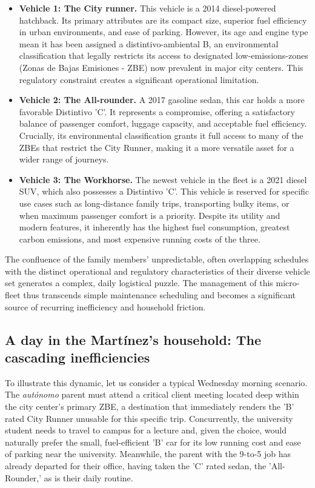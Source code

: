 \begin{itemize}
\item \textbf{Vehicle 1: The City runner.} This vehicle is a 2014 diesel-powered hatchback. Its primary attributes are its compact size, superior fuel efficiency in urban environments, and ease of parking. However, its age and engine type mean it has been assigned a \gls{distintivo-ambiental} B, an environmental classification that legally restricts its access to designated \gls{low-emissions-zones} (Zonas de Bajas Emisiones - ZBE) now prevalent in major city centers. This regulatory constraint creates a significant operational limitation.
\item \textbf{Vehicle 2: The All-rounder.} A 2017 gasoline sedan, this car holds a more favorable Distintivo 'C'. It represents a compromise, offering a satisfactory balance of passenger comfort, luggage capacity, and acceptable fuel efficiency. Crucially, its environmental classification grants it full access to many of the ZBEs that restrict the City Runner, making it a more versatile asset for a wider range of journeys.
\item \textbf{Vehicle 3: The Workhorse.} The newest vehicle in the fleet is a 2021 diesel SUV, which also possesses a Distintivo 'C'. This vehicle is reserved for specific use cases such as long-distance family trips, transporting bulky items, or when maximum passenger comfort is a priority. Despite its utility and modern features, it inherently has the highest fuel consumption, greatest carbon emissions, and most expensive running costs of the three.
\end{itemize}

The confluence of the family members' unpredictable, often overlapping schedules with the distinct operational and regulatory characteristics of their diverse vehicle set generates a complex, daily logistical puzzle. The management of this micro-fleet thus transcends simple maintenance scheduling and becomes a significant source of recurring inefficiency and household friction.

\subsection{A day in the Martínez's household: The cascading inefficiencies}

To illustrate this dynamic, let us consider a typical Wednesday morning scenario. The \textit{autónomo} parent must attend a critical client meeting located deep within the city center's primary ZBE, a destination that immediately renders the 'B' rated City Runner unusable for this specific trip. Concurrently, the university student needs to travel to campus for a lecture and, given the choice, would naturally prefer the small, fuel-efficient 'B' car for its low running cost and ease of parking near the university. Meanwhile, the parent with the 9-to-5 job has already departed for their office, having taken the 'C' rated sedan, the 'All-Rounder,' as is their daily routine.

